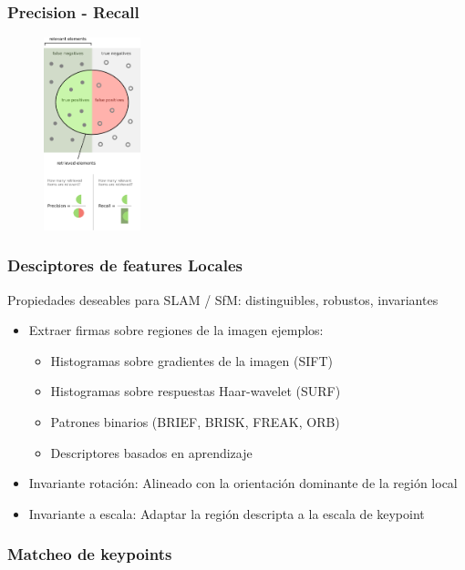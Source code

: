 \begin{frame}
	\frametitle{Precision - Recall}
	\footnotesize
	
	
	\begin{figure}
		\includegraphics[width=0.25\textwidth]{./images/precision_recall.pdf}
	\end{figure}
\end{frame}

\begin{frame}
	\frametitle{Desciptores de features Locales}
	\footnotesize
	
	Propiedades deseables para SLAM / SfM: distinguibles, robustos, invariantes
	\begin{itemize}
		\item Extraer firmas sobre regiones de la imagen ejemplos:
		\begin{itemize}
			\item Histogramas sobre gradientes de la imagen (SIFT)
			\item Histogramas sobre respuestas Haar-wavelet (SURF)
			\item Patrones binarios (BRIEF, BRISK, FREAK, ORB)
			\item Descriptores basados en aprendizaje
		\end{itemize}
		\item Invariante rotación: Alineado con la orientación dominante de la región local
		\item Invariante a escala: Adaptar la región descripta a la escala de keypoint
	\end{itemize}
	
\end{frame}

\begin{frame}
	\frametitle{Matcheo de keypoints}
	\footnotesize
	
\end{frame}

